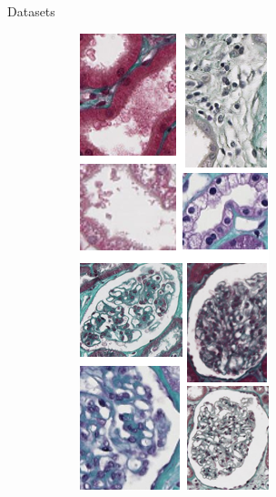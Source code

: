 \documentclass{beamer}
\begin{document}
\begin{frame}{Datasets}
\begin{figure}
    \begin{subfigure}{0.1\textwidth}\includegraphics[scale=0.35]{images/illus_glomeruli.png}\end{subfigure}
\end{figure}

\end{frame}
\end{document}
